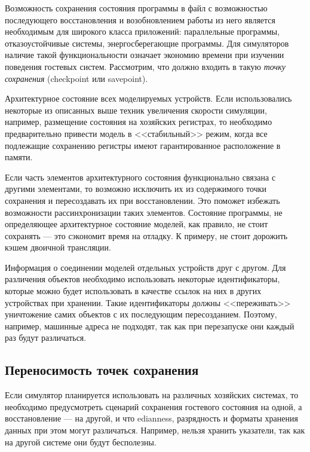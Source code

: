 Возможность сохранения состояния программы в файл с возможностью последующего восстановления и возобновлением работы из него является необходимым для широкого класса приложений: параллельные программы, отказоустойчивые системы, энергосберегающие программы. Для симуляторов наличие такой функциональности означает экономию времени при изучении поведения гостевых систем. Рассмотрим, что должно входить в такую \textit{точку сохранения} (\abbr checkpoint или savepoint).

\begin{itemize*}
    \item Архитектурное состояние всех моделируемых устройств. Если использовались некоторые из описанных выше техник увеличения скорости симуляции, например, размещение состояния на хозяйских регистрах, то необходимо предварительно привести модель в <<стабильный>> режим, когда все подлежащие сохранению регистры имеют гарантированное расположение в памяти.
    
\item    Если часть элементов архитектурного состояния функционально связана с другими элементами, то возможно исключить их из содержимого точки сохранения и пересоздавать их при восстановлении. Это поможет избежать возможности рассинхронизации таких элементов. Состояние программы, не определяющее архитектурное состояние моделей, как правило, не стоит сохранять --- это сэкономит время на отладку. К примеру, не стоит дорожить кэшем двоичной трансляции.
    
    \item Информация о соединении моделей отдельных устройств друг с другом. Для различения объектов необходимо использовать некоторые идентификаторы, которые можно будет использовать в качестве ссылок на них в других устройствах при хранении. Такие идентификаторы должны <<переживать>> уничтожение самих объектов с их последующим пересозданием. Поэтому, например, машинные адреса не подходят, так как при перезапуске они каждый раз будут различаться.
\end{itemize*}

\subsection{Переносимость точек сохранения}

Если симулятор планируется использовать на различных хозяйских системах, то необходимо предусмотреть сценарий сохранения гостевого состояния на одной, а восстановление --- на другой, и что edianness, разрядность и форматы хранения данных при этом могут различаться. Например, нельзя хранить указатели, так как на другой системе они будут бесполезны.

